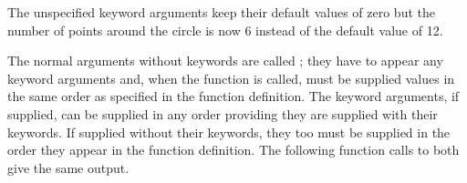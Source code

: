 \documentclass[letterpaper,10pt,english]{sphinxmanual}
\begin{document}
\begin{sphinxVerbatim}[commandchars=\\\{\}]
 
\end{sphinxVerbatim}

\sphinxAtStartPar
The unspecified keyword arguments keep their default values of zero but the number of points  around the circle is now 6 instead of the default value of 12.

\sphinxAtStartPar
The normal arguments without keywords are called ; they have to appear  any keyword arguments and, when the function is called, must be supplied values in the same order as specified in the function definition.  The keyword arguments, if supplied, can be supplied in any order providing they are supplied with their keywords.  If supplied without their keywords, they too must be supplied in the order they appear in the function definition.  The following function calls to  both give the same output.

\begin{sphinxVerbatim}[commandchars=\\\{\},numbers=left,firstnumber=1,stepnumber=1]
   
\PYG{p}{[}    \PYG{p}{]}

       
\PYG{p}{[}    \PYG{p}{]} \PYG{p}{[}         
\PYG{g+go}{                  6.59807621,  1.40192379]))}
\end{sphinxVerbatim}
\end{document}
